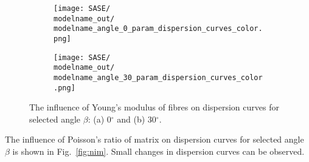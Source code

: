 \documentclass[preprint,12pt]{elsarticle}
\begin{document}
\begin{figure} [h!]
	\centering
	\newcommand{\modelname}{SASE5_plain_weave}
	\begin{subfigure}[b]{0.49\textwidth}
		\centering
		\texttt{[image: SASE/\\modelname\_out/\\modelname\_angle\_0\_param\_dispersion\_curves\_color.png]}
		\caption{}
		\label{fig:ef0}
	\end{subfigure}
	\hfill
	\begin{subfigure}[b]{0.49\textwidth}
		\centering
		\texttt{[image: SASE/\\modelname\_out/\\modelname\_angle\_30\_param\_dispersion\_curves\_color.png]}
		\caption{}
		\label{fig:ef30}
	\end{subfigure}
		\caption{The influence of Young's modulus of fibres on dispersion curves for selected angle $\beta$: (a) 0$^{\circ}$ and (b) 30$^{\circ}$.} 
	\label{fig:ef}
\end{figure}

The influence of  Poisson's ratio of matrix on dispersion curves for selected angle $\beta$ is shown in Fig.~\ref{fig:nim}. Small changes in dispersion curves can be observed.
\end{document}
